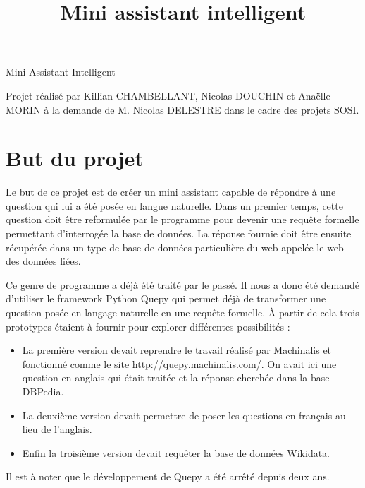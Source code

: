 \documentclass[11pt,a4paper]{article}
\title{Mini assistant intelligent}
\author{}
\begin{document}

\Huge
\begin{center}
  Mini Assistant Intelligent
\end{center}
\normalsize
Projet réalisé par Killian CHAMBELLANT, Nicolas DOUCHIN et Anaëlle MORIN à la demande de M. Nicolas DELESTRE dans le cadre des projets SOSI.


\section*{But du projet}\par
Le but de ce projet est de créer un mini assistant capable de répondre à une question qui lui a été posée en langue naturelle. 
Dans un premier temps, cette question doit être reformulée par le programme pour devenir une requête formelle permettant d'interrogée la base de données. La réponse fournie doit être ensuite récupérée dans un type de base de données particulière du web appelée le web des données liées.\par 
Ce genre de programme a déjà été traité par le passé. Il nous a donc été demandé d'utiliser le framework Python Quepy qui permet déjà de transformer une question posée en langage naturelle en une requête formelle. À partir de cela trois prototypes étaient à fournir pour explorer différentes possibilités : \par
\begin{itemize}
\item La première version devait reprendre le travail réalisé par Machinalis et fonctionné comme le site \url{http://quepy.machinalis.com/}. On avait ici une question en anglais qui était traitée et la réponse cherchée dans la base DBPedia.
\item La deuxième version devait permettre de poser les questions en français au lieu de l'anglais.
\item Enfin la troisième version devait requêter la base de données Wikidata.
\end{itemize}\par
Il est à noter que le développement de Quepy a été arrêté depuis deux ans.
\end{document}
